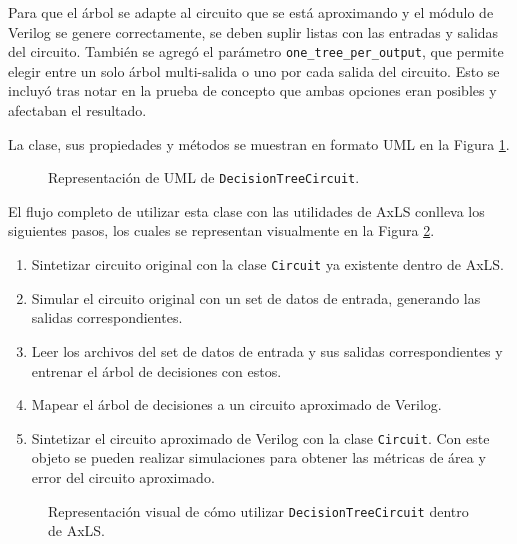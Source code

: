 Para que el árbol se adapte al circuito que se está aproximando y el módulo de
Verilog se genere correctamente, se deben suplir listas con las entradas y
salidas del circuito.
También se agregó el parámetro \texttt{one\_tree\_per\_output}, que permite
elegir entre un solo árbol multi-salida o uno por cada salida del circuito.
Esto se incluyó tras notar en la prueba de concepto que ambas opciones eran
posibles y afectaban el resultado.

La clase, sus propiedades y métodos se muestran en formato UML en la Figura
\ref{fig:UML}.

\begin{figure}[htb]
  \centering
  
  \caption{Representación de UML de \texttt{DecisionTreeCircuit}.}
  \label{fig:UML}
\end{figure}

El flujo completo de utilizar esta clase con las utilidades de AxLS conlleva los siguientes pasos, los cuales se representan visualmente en la Figura \ref{fig:flow}.

\begin{enumerate}
  \item Sintetizar circuito original con la clase \texttt{Circuit} ya existente dentro de AxLS.
  \item Simular el circuito original con un set de datos de entrada, generando las salidas correspondientes.
  \item Leer los archivos del set de datos de entrada y sus salidas correspondientes y entrenar el árbol de decisiones con estos.
  \item Mapear el árbol de decisiones a un circuito aproximado de Verilog.
  \item Sintetizar el circuito aproximado de Verilog con la clase \texttt{Circuit}. Con este objeto se pueden realizar simulaciones para obtener las métricas de área y error del circuito aproximado.
\end{enumerate}

\begin{figure}[htb]
  \centering
  
  \caption{Representación visual de cómo utilizar \texttt{DecisionTreeCircuit} dentro de AxLS.}
  \label{fig:flow}
\end{figure}

